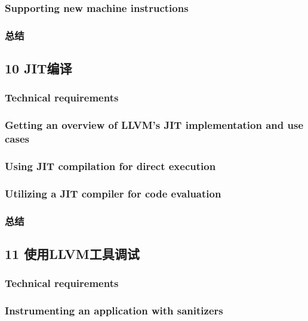 \documentclass[11pt,a4paper,UTF8]{ctexart}
\begin{document}
		\subsubsection{Supporting new machine instructions}
		\subsubsection{总结}
	\subsection{10 JIT编译}
		\subsubsection{Technical requirements}
		\subsubsection{Getting an overview of LLVM's JIT implementation and use cases}
		\subsubsection{Using JIT compilation for direct execution}
		\subsubsection{Utilizing a JIT compiler for code evaluation}
		\subsubsection{总结}
	\subsection{11 使用LLVM工具调试}
		\subsubsection{Technical requirements}
		\subsubsection{Instrumenting an application with sanitizers}
\end{document}
